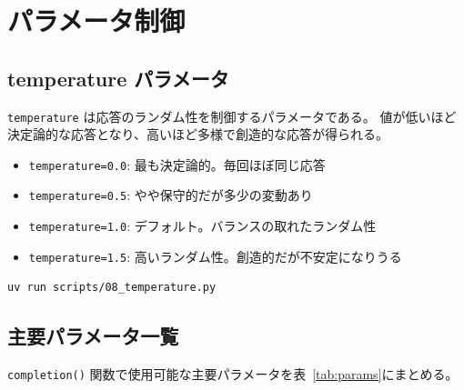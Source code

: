\documentclass[a4paper,11pt]{ltjsarticle}
\newcommand{\code}[1]{\texttt{#1}}
\begin{document}
\section{パラメータ制御}
\label{sec:parameters}

\subsection{temperature パラメータ}
\label{subsec:temperature}

\code{temperature} は応答のランダム性を制御するパラメータである。
値が低いほど決定論的な応答となり、高いほど多様で創造的な応答が得られる。

\begin{itemize}
  \item \code{temperature=0.0}: 最も決定論的。毎回ほぼ同じ応答
  \item \code{temperature=0.5}: やや保守的だが多少の変動あり
  \item \code{temperature=1.0}: デフォルト。バランスの取れたランダム性
  \item \code{temperature=1.5}: 高いランダム性。創造的だが不安定になりうる
\end{itemize}



\begin{lstlisting}[style=bash]
uv run scripts/08_temperature.py
\end{lstlisting}

\subsection{主要パラメータ一覧}

\code{completion()} 関数で使用可能な主要パラメータを表~\ref{tab:params}にまとめる。
\end{document}
